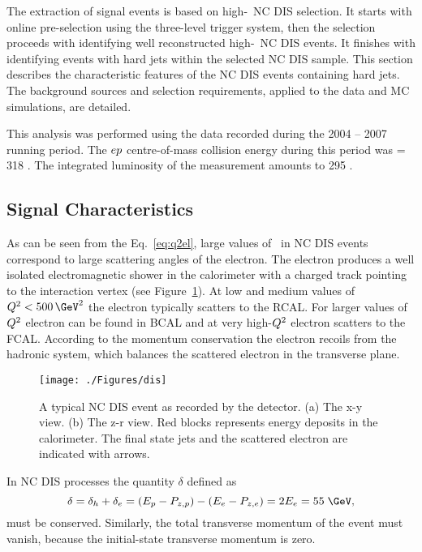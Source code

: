 The extraction of signal events is based on high-\qsq\, NC DIS selection. It starts with online pre-selection using the three-level trigger system, then the selection proceeds with identifying well reconstructed high-\qsq\, NC DIS events. It finishes with identifying events with hard jets within the selected NC DIS sample. This section describes the characteristic features of the NC DIS events containing hard jets. The background sources and selection requirements, applied to the data and MC simulations, are detailed.

This analysis was performed using the data recorded during the 2004 -- 2007 running period. The $\mbox{$e p$}$ centre-of-mass collision energy during this period was \sqs = 318 \GeV. The integrated luminosity of the measurement amounts to 295 \invpb.

\subsection{Signal Characteristics}
\label{subsec:signalchar}
As can be seen from the Eq.~\ref{eq:q2el}, large values of \qsq\, in NC DIS events correspond to large scattering angles of the electron. The electron produces a well isolated electromagnetic shower in the calorimeter with a charged track pointing to the interaction vertex (see Figure~\ref{fig:ncdiseventdisplay}). At low and medium values of $\qsq < 500\, \GeV^2$ the electron typically scatters to the RCAL. For larger values of $\mbox{${Q^2}$}$ electron can be found in BCAL and at very high-$\mbox{${Q^2}$}$ electron scatters to the FCAL. According to the momentum conservation the electron recoils from the hadronic system, which balances the scattered electron in the transverse plane.
\begin{figure}[htbp]
	\centering
	\texttt{[image: ./Figures/dis]} 
	\caption{A typical NC DIS event as recorded by the \zeus detector. (a) The x-y view. (b) The z-r view. Red blocks represents energy deposits in the calorimeter. The final state jets and the scattered electron are indicated with arrows.}
	\label{fig:ncdiseventdisplay}
\end{figure}
In NC DIS processes the quantity $\delta$ defined as
\begin{equation}
\delta = \delta_h + \delta_e = \left( E_p - P_{z,p} \right) - \left( E_e - P_{z,e}\right) = 2E_e = 55\;\GeV,
\label{eq:deltadis}
\end{equation}
must be conserved. Similarly, the total transverse momentum of the event must vanish, because the initial-state transverse momentum is zero.

